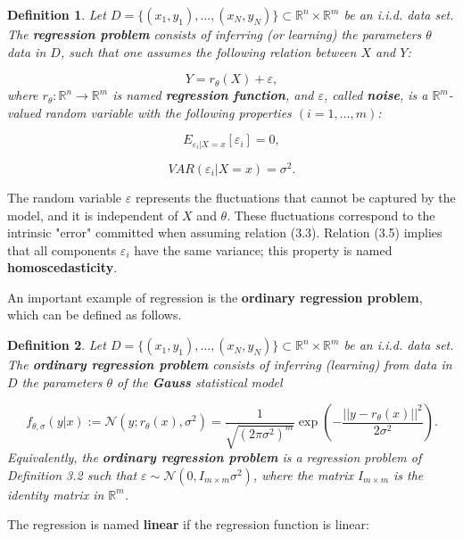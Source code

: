 \documentclass{report}
\newtheorem{definition}{Definition}[chapter]
\begin{document}
\begin{definition}
Let $D = \{(x_1,y_1),\dots,(x_N,y_N)\} \subset \mathbb{R}^n \times \mathbb{R}^m$ be an i.i.d. data set. The \textbf{regression problem} consists of inferring (or learning) the parameters $\theta$ data in $D$, such that one assumes the following relation between $X$ and $Y$:

\begin{equation}
Y = r_\theta(X) + \varepsilon,
\end{equation}
where $r_\theta : \mathbb{R}^n \to \mathbb{R}^m$ is named \textbf{regression function}, and $\varepsilon$, called \textbf{noise}, is a $\mathbb{R}^m$-valued random variable with the following properties $(i = 1,\dots,m)$:

\begin{equation}
E_{\varepsilon_i|X = x}[\varepsilon_i] = 0,
\end{equation}

\begin{equation}
VAR(\varepsilon_i|X = x) = \sigma^2.
\end{equation}
\end{definition}
The random variable $\varepsilon$ represents the fluctuations that cannot be captured by the model, and it is independent of $X$ and $\theta$. These fluctuations correspond to the intrinsic "error" committed when assuming relation (3.3). Relation (3.5) implies that all components $\varepsilon_i$ have the same variance; this property is named \textbf{homoscedasticity}.

An important example of regression is the \textbf{ordinary regression problem}, which can be defined as follows.

\begin{definition}
Let $D = \{(x_1,y_1),\dots,(x_N,y_N)\} \subset \mathbb{R}^n \times \mathbb{R}^m$ be an i.i.d. data set. The \textbf{ordinary regression problem} consists of inferring (learning) from data in $D$ the parameters $\theta$ of the \textbf{Gauss} statistical model

\begin{equation}
f_{\theta,\sigma}(y|x) := \mathcal{N}(y;r_\theta(x),\sigma^2) = \frac{1}{\sqrt{(2\pi\sigma^2)^m}}\exp\left(-\frac{||y-r_\theta(x)||^2}{2\sigma^2}\right).
\end{equation}
Equivalently, the \textbf{ordinary regression problem} is a regression problem of Definition 3.2 such that $\varepsilon \sim \mathcal{N}(0,I_{m\times m}\sigma^2)$, where the matrix $I_{m\times m}$ is the identity matrix in $\mathbb{R}^m$.
\end{definition}
The regression is named \textbf{linear} if the regression function is linear:
\end{document}
